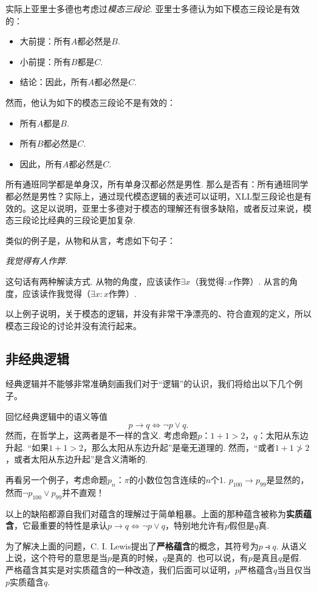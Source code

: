 实际上亚里士多德也考虑过\emph{模态三段论}. 亚里士多德认为如下模态三段论是有效的：%
\begin{itemize}
    \item 大前提：所有$A$都必然是$B$.
    \item 小前提：所有$B$都是$C$.
    \item 结论：因此，所有$A$都必然是$C$.
\end{itemize}
然而，他认为如下的模态三段论不是有效的：
\begin{itemize}
\item 所有$A$都是$B$.
\item 所有$B$都必然是$C$.
\item 因此，所有$A$都必然是$C$.
\end{itemize}
所有通班同学都是单身汉，所有单身汉都必然是男性. 那么是否有：所有通班同学都必然是男性？实际上，通过现代模态逻辑的表述可以证明，XLL型三段论也是有效的。这足以说明，亚里士多德对于模态的理解还有很多缺陷，或者反过来说，模态三段论比经典的三段论更加复杂.
    
 类似的例子是，从物和从言，考虑如下句子：
\begin{center}
\itshape 我觉得有人作弊.
\end{center}
这句话有两种解读方式. 从物的角度，应该读作$\exists x$（我觉得$:x$作弊）. 从言的角度，应该读作我觉得（$\exists x:x$作弊）.

以上例子说明，关于模态的逻辑，并没有非常干净漂亮的、符合直观的定义，所以模态三段论的讨论并没有流行起来。
    
\subsection{非经典逻辑}
经典逻辑并不能够非常准确刻画我们对于“逻辑”的认识，我们将给出以下几个例子。

回忆经典逻辑中的语义等值
        \[p\to q\iff\neg p\vee q.\]
然而，在哲学上，这两者是不一样的含义. 考虑命题$p$：$1+1>2$，$q$：太阳从东边升起. “如果$1+1>2$，那么太阳从东边升起”是毫无道理的. 然而，“或者$1+1\not>2$，或者太阳从东边升起”是含义清晰的.

再看另一个例子，考虑命题$p_n$：$\pi$的小数位包含连续的$n$个1. $p_{100}\to p_{99}$是显然的，然而$\neg p_{100}\vee p_{99}$并不直观！
    
以上的缺陷都源自我们对蕴含的理解过于简单粗暴。上面的那种蕴含被称为\textbf{实质蕴含}，它最重要的特性是承认$p\rightarrow q \iff
\lnot {p}\vee q$，特别地允许有$p$假但是$q$真.

为了解决上面的问题，C. I. Lewis提出了\textbf{严格蕴含}的概念，其符号为$p\strictif q$. 从语义上说，这个符号的意思是当$p$是真的时候，$q$是真的. 也可以说，有$p$是真且$q$是假. 严格蕴含其实是对实质蕴含的一种改造，我们后面可以证明，$p$严格蕴含$q$当且仅当 $p$实质蕴含$q$.
    
